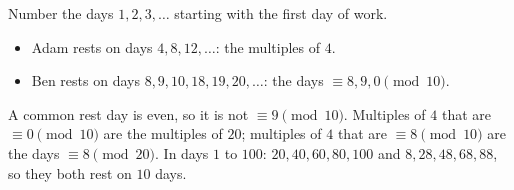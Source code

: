 Number the days $1,2,3,\dots$ starting with the first day of work.
\begin{itemize}
\item Adam rests on days $4,8,12,\dots$: the multiples of $4$.
\item Ben rests on days $8,9,10,18,19,20,\dots$: the days $\equiv8,9,0\pmod{10}$.
\end{itemize}
A common rest day is even, so it is not $\equiv9\pmod{10}$. Multiples of $4$ that are $\equiv0\pmod{10}$ are the multiples of $20$; multiples of $4$ that are $\equiv8\pmod{10}$ are the days $\equiv8\pmod{20}$. In days $1$ to $100$: $20,40,60,80,100$ and $8,28,48,68,88$, so they both rest on $\boxed{10}$ days.
